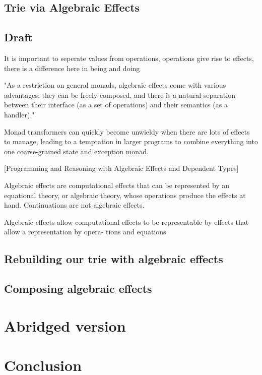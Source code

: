 \documentclass[a4paper,10pt]{article}
\theoremstyle{definition}
\begin{document}
\subsection{Trie via Algebraic Effects}

\subsection{Draft}

It is important to seperate values from operations, operations give rise to effects,
there is a difference here in being and doing

"As a restriction on general monads, algebraic effects come with various advantages:
they can be freely composed, 
and there is a natural separation between their interface (as a set of operations) and their semantics (as a handler)."


Monad transformers can quickly become unwieldy when there are lots of effects to manage, leading to a temptation in larger programs to combine everything into one coarse-grained state and exception monad.

[Programming and Reasoning with Algebraic Effects and Dependent Types]


Algebraic effects are computational effects that can be represented by an equational theory, or algebraic theory, whose operations produce the effects at hand.
Continuations are not algebraic effects.

Algebraic effects allow computational effects to be representable by
effects that allow a representation by opera- tions and equations

\subsection{Rebuilding our trie with algebraic effects}
\subsection{Composing algebraic effects}

\pagebreak
\section{Abridged version}

\pagebreak
\section{Conclusion}

\medskip



\end{document}
